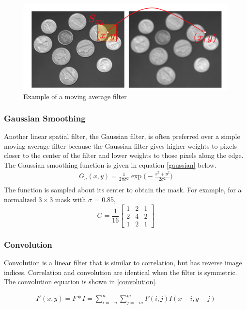 \documentclass[twoside]{article}
\begin{document}
\begin{figure}[h]
	\centering
	\includegraphics[scale=.4]{blur.png}
    \caption{Example of a moving average filter}
    \label{noisy}
\end{figure}

\subsubsection{Gaussian Smoothing}
Another linear spatial filter, the Gaussian filter, is often preferred over a simple moving average filter because the Gaussian filter gives higher weights to pixels closer to the center of the filter and lower weights to those pixels along the edge. The Gaussian smoothing function is given in equation \ref{gaussian} below.
\begin{equation}
  \label{gaussian}
  \begin{aligned}
  	G_\sigma(x,y) = \frac{1}{2\pi\sigma^2} \exp \bigg(-\frac{x^2 + y^2}{2\sigma^2} \bigg)\\
  \end{aligned}
\end{equation}
The function is sampled about its center to obtain the mask. For example, for a normalized $3\times3$ mask with $\sigma$ = 0.85,
\[
G = \frac{1}{16}
\begin{bmatrix}
1 & 2 & 1\\
2 & 4 & 2\\
1 & 2 & 1
\end{bmatrix}
\]

\subsubsection{Convolution}
Convolution is a linear filter that is similar to correlation, but has reverse image indices. Correlation and convolution are identical when the filter is symmetric. The convolution equation is shown in \ref{convolution}.

\begin{equation}
  \label{convolution}
  \begin{aligned}
  	I'(x,y) = F * I = \sum_{i=-n}^n \sum_{j=-m}^m F(i,j)I(x-i,y-j)\\
  \end{aligned}
\end{equation}
\end{document}

